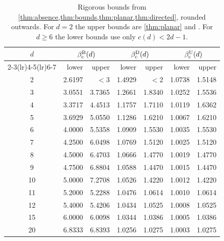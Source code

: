 \begin{table}[ht]
\centering
\begin{tabular}{crrrrrr}
\toprule
$d$ & \multicolumn{2}{c}{$\beta_{\mathrm c}^{\mathrm B}(d)$} & \multicolumn{2}{c}{$\beta_{\mathrm c}^{\mathrm D}(d)$} & \multicolumn{2}{c}{$\beta_{\mathrm c}^{\mathrm U}(d)$}\\
\cmidrule(lr){2-3}\cmidrule(lr){4-5}\cmidrule(lr){6-7}
 & lower & upper & lower & upper & lower & upper\\
\midrule
2 & 2.6197 & $<3$ & 1.4929 & $<2$ & 1.0738 & 1.5148\\
3 & 3.0551 & 3.7365 & 1.2661 & 1.8340 & 1.0252 & 1.5536\\
4 & 3.3717 & 4.4513 & 1.1757 & 1.7110 & 1.0119 & 1.6362\\
5 & 3.6929 & 5.0550 & 1.1286 & 1.6210 & 1.0067 & 1.6210\\
6 & 4.0000 & 5.5358 & 1.0909 & 1.5530 & 1.0035 & 1.5530\\
7 & 4.2500 & 6.0498 & 1.0769 & 1.5120 & 1.0025 & 1.5120\\
8 & 4.5000 & 6.4703 & 1.0666 & 1.4770 & 1.0019 & 1.4770\\
9 & 4.7500 & 6.8804 & 1.0588 & 1.4470 & 1.0015 & 1.4470\\
10 & 5.0000 & 7.2708 & 1.0526 & 1.4220 & 1.0012 & 1.4220\\
11 & 5.2000 & 5.2288 & 1.0476 & 1.0614 & 1.0010 & 1.0614\\
12 & 5.4000 & 5.4206 & 1.0434 & 1.0525 & 1.0008 & 1.0525\\
15 & 6.0000 & 6.0098 & 1.0344 & 1.0386 & 1.0005 & 1.0386\\
20 & 6.8333 & 6.8393 & 1.0256 & 1.0275 & 1.0003 & 1.0275\\
\bottomrule
\end{tabular}
\caption{Rigorous bounds from \cref{thm:absence,thm:bounds,thm:planar,thm:directed}, rounded outwards. For $d=2$ the upper bounds are \cref{thm:planar} and \cite[Theorem~2.3]{CHJK26}. For $d\ge6$ the lower bounds use only $c(d)<2d-1$.}\label{tab:bounds}
\end{table}
